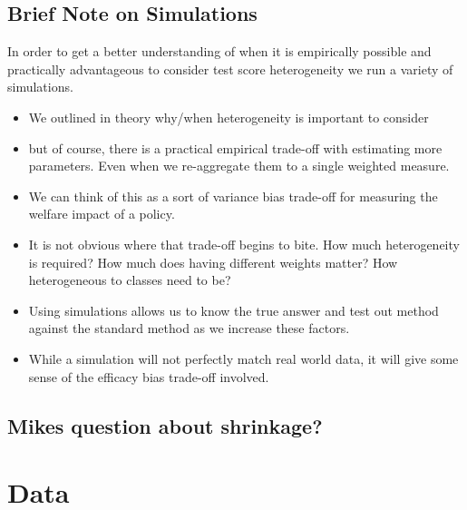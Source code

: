 \documentclass{article}
\theoremstyle{definition}
\theoremstyle{definition}
\theoremstyle{definition}
\theoremstyle{definition}
\begin{document}
    \subsection{Brief Note on Simulations }
        In order to get a better understanding of when it is empirically possible and practically advantageous to consider test score heterogeneity we run a variety of simulations. 
        \begin{itemize}
            \item We outlined in theory why/when heterogeneity is important to consider
            \item but of course, there is a practical empirical trade-off with estimating more parameters. Even when we re-aggregate them to a single weighted measure. 
            \item We can think of this as a sort of variance bias trade-off for measuring the welfare impact of a policy. 
            \item It is not obvious where that trade-off begins to bite. How much heterogeneity is required? How much does having different weights matter? How heterogeneous to classes need to be? 
            \item Using simulations allows us to know the true answer and test out method against the standard method as we increase these factors. 
            \item While a simulation will not perfectly match real world data, it will give some sense of the efficacy bias trade-off involved. 
            
        \end{itemize}
        
        

    \subsection{Mikes question about shrinkage?}

\section{Data}
\end{document}
